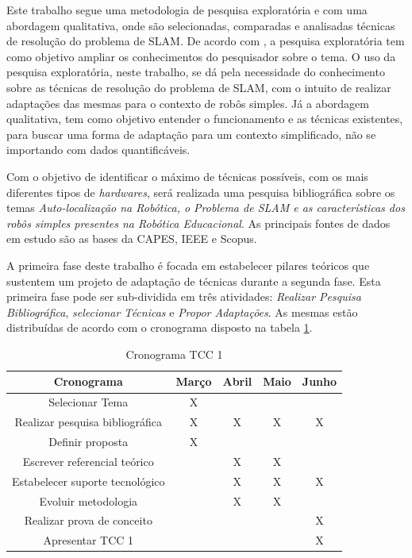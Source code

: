 Este trabalho segue uma metodologia de pesquisa exploratória e com uma abordagem qualitativa, onde são selecionadas, comparadas e analisadas técnicas de resolução do problema de SLAM. De acordo com \cite{metodologiaCientifica}, a pesquisa exploratória tem como objetivo ampliar os conhecimentos do pesquisador sobre o tema. O uso da pesquisa exploratória, neste trabalho, se dá pela necessidade do conhecimento sobre as técnicas de resolução do problema de SLAM, com o intuito de realizar adaptações das mesmas para o contexto de robôs simples. Já a abordagem qualitativa, tem como objetivo entender o funcionamento e as técnicas existentes, para buscar uma forma de adaptação para um contexto simplificado, não se importando com dados quantificáveis.

Com o objetivo de identificar o máximo de técnicas possíveis, com os mais diferentes tipos de \textit{hardwares}, será realizada uma pesquisa bibliográfica sobre os temas \textit{Auto-localização na Robótica, o Problema de SLAM e as características dos robôs simples presentes na Robótica Educacional}. As principais fontes de dados em estudo são as bases da CAPES, IEEE e Scopus.

A primeira fase deste trabalho é focada em estabelecer pilares teóricos que sustentem um projeto de adaptação de técnicas durante a segunda fase. Esta primeira fase pode ser sub-dividida em três atividades: \textit{Realizar Pesquisa Bibliográfica}, \textit{selecionar Técnicas} e \textit{Propor Adaptações}. As mesmas estão distribuídas de acordo com o cronograma disposto na tabela \ref{tab:cronograma}.

\begin{table}[H]
	\centering
	\begin{tabular}{|c|c|c|c|c|}
		\hline
		\textbf{Cronograma}             & \textbf{Março} & \textbf{Abril} & \textbf{Maio} & \textbf{Junho} \\ \hline
		Selecionar Tema                 & X              &                &               &                \\ \hline
		Realizar pesquisa bibliográfica & X              & X              & X             & X              \\ \hline
		Definir proposta                & X              &                &               &                \\ \hline
		Escrever referencial teórico    &                & X              & X             &                \\ \hline
		Estabelecer suporte tecnológico &                & X              & X             & X              \\ \hline
		Evoluir metodologia             &                & X              & X             &                \\ \hline
		Realizar prova de conceito      &                &                &               & X              \\ \hline
		Apresentar TCC 1                &                &                &               & X              \\ \hline
	\end{tabular}
	\caption{Cronograma TCC 1}
	\label{tab:cronograma}
\end{table}

